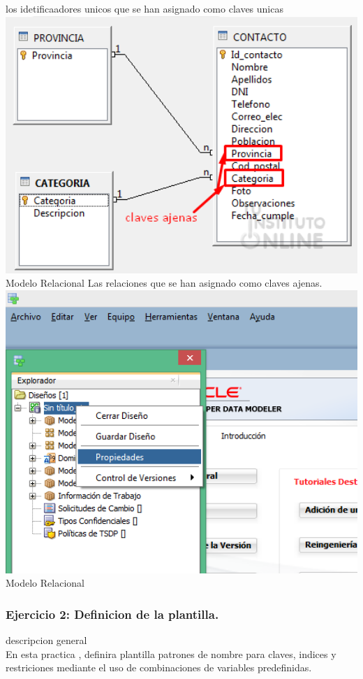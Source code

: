 \documentclass[12pt,letterpaper]{article}
\begin{document}
los idetificaadores unicos que se han asignado como claves unicas\\
 \includegraphics[width=15cm]{./giselaImagen/imagen3.png} 
		\\ Modelo Relacional
Las relaciones que se han asignado como claves ajenas. \\
 \includegraphics[width=15cm]{./giselaImagen/imagen4.png} 
		\\ Modelo Relacional
		\subsubsection{Ejercicio 2: Definicion de la plantilla.}
		descripcion general  \\
En esta practica , definira plantilla patrones de nombre para claves, indices y restriciones mediante el uso de combinaciones de variables predefinidas. \\
\end{document}
